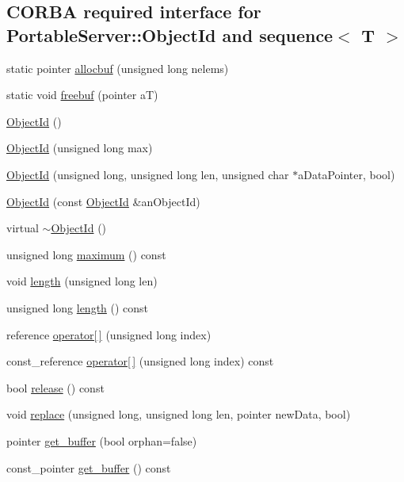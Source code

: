 \subsection*{C\+O\+R\+BA required interface for Portable\+Server\+:\+:Object\+Id and sequence$<$ T $>$}
\begin{DoxyCompactItemize}
\item 
static pointer \hyperlink{class_base_1_1_object_id_a3028106d58f6db9df06c2faf797f30f8}{allocbuf} (unsigned long nelems)
\item 
static void \hyperlink{class_base_1_1_object_id_a2a50ef3cccf4fd20fd17f2c52fd00c9d}{freebuf} (pointer aT)
\item 
\hyperlink{class_base_1_1_object_id_a62a23904516e14dbef8fee4e5804fa6c}{Object\+Id} ()
\item 
\hyperlink{class_base_1_1_object_id_a198bf2ac34a1ab0150a43c97d8002cec}{Object\+Id} (unsigned long max)
\item 
\hyperlink{class_base_1_1_object_id_a4f0abd7ada085282e495d1a5fab3ea43}{Object\+Id} (unsigned long, unsigned long len, unsigned char $\ast$a\+Data\+Pointer, bool)
\item 
\hyperlink{class_base_1_1_object_id_abdd4924553c835229354677dad7c3c26}{Object\+Id} (const \hyperlink{class_base_1_1_object_id}{Object\+Id} \&an\+Object\+Id)
\item 
virtual \hyperlink{class_base_1_1_object_id_a62fd29d91e79c3c9130f45cbb32275fc}{$\sim$\+Object\+Id} ()
\item 
unsigned long \hyperlink{class_base_1_1_object_id_a4a48d8c6f85bd9fd2991710635d316d8}{maximum} () const 
\item 
void \hyperlink{class_base_1_1_object_id_a2eae06c2581239d292ea3467c3cfdfba}{length} (unsigned long len)
\item 
unsigned long \hyperlink{class_base_1_1_object_id_aad6bf09824bc18612fa6654cb5f0bb0f}{length} () const 
\item 
reference \hyperlink{class_base_1_1_object_id_a518d985d2a670fdcb6ef360e2655e44b}{operator\mbox{[}$\,$\mbox{]}} (unsigned long index)
\item 
const\+\_\+reference \hyperlink{class_base_1_1_object_id_a8a1c7b67bea028bf2073f81751fc3f94}{operator\mbox{[}$\,$\mbox{]}} (unsigned long index) const 
\item 
bool \hyperlink{class_base_1_1_object_id_a27eb724a90e960cdf691c76391cc786d}{release} () const 
\item 
void \hyperlink{class_base_1_1_object_id_a5469cb64007c5007be8ab2893fb3848a}{replace} (unsigned long, unsigned long len, pointer new\+Data, bool)
\item 
pointer \hyperlink{class_base_1_1_object_id_aa91cd5a6d4b78734f903138614098868}{get\+\_\+buffer} (bool orphan=false)
\item 
const\+\_\+pointer \hyperlink{class_base_1_1_object_id_a0f4d8c05f11d882598daf15c2c1cd714}{get\+\_\+buffer} () const 
\end{DoxyCompactItemize}


